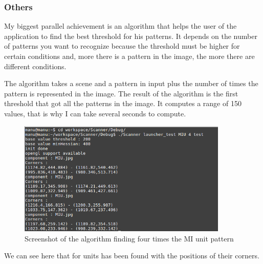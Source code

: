 	\subsubsection{Others}
	
	\par My biggest parallel achievement is an algorithm that helps the user of the application to find the best threshold for his patterns. It depends on the number of patterns you want to recognize because the threshold must be higher for certain conditions and, more there is a pattern in the image, the more there are different conditions. 
	\par The algorithm takes a scene and a pattern in input plus the number of times the pattern is represented in the image. The result of the algorithm is the first threshold that got all the patterns in the image. It computes a range of 150 values, that is why I can take several seconds to compute.
	
	\begin{figure}[h]
		\begin{center}
			\includegraphics[width=10cm]{images_not_compressed/tester.png}
			\caption{Screenshot of the algorithm finding four times the MI unit pattern}
		\end{center}
	\end{figure}	
	
	\par We can see here that for units has been found with the positions of their corners.
	
